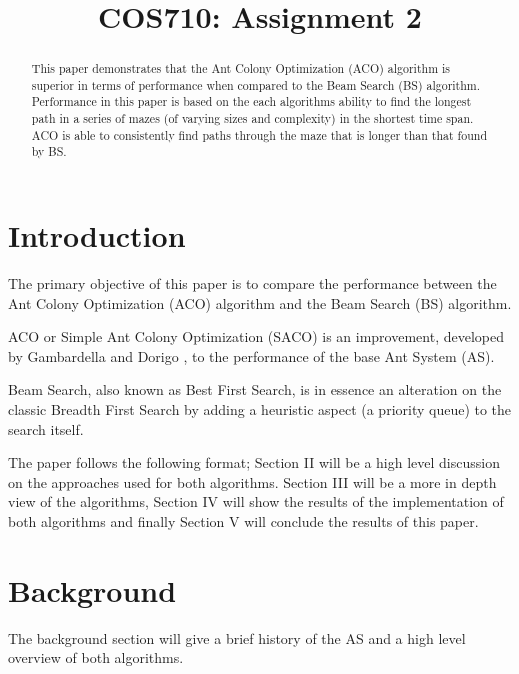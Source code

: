 \documentclass[conference]{IEEEtran}
\begin{document}
\title{COS710: Assignment 2}

\author{
}
\maketitle

\begin{abstract}
    This paper demonstrates that the Ant Colony Optimization (ACO) algorithm is superior in terms of performance when compared to the Beam Search (BS) algorithm. Performance in this paper is based on the each algorithms ability to find the longest path in a series of mazes (of varying sizes and complexity) in the shortest time span. ACO is able to consistently find paths through the maze that is longer than that found by BS.
\end{abstract}


\section{Introduction}
    The primary objective of this paper is to compare the performance between the Ant Colony Optimization (ACO) algorithm and the Beam Search (BS) algorithm.
    
    ACO or Simple Ant Colony Optimization (SACO) is an improvement, developed by Gambardella and Dorigo \cite{Slides1}, to the performance of the base Ant System (AS).
    
    Beam Search, also known as Best First Search, is in essence an alteration on the classic Breadth First Search by adding a heuristic aspect (a priority queue) to the search itself.
    
    The paper follows the following format; Section II will be a high level discussion on the approaches used for both algorithms. Section III will be a more in depth view of the algorithms, Section IV will show the results of the implementation of both algorithms and finally Section V will conclude the results of this paper.
\section{Background}
    The background section will give a brief history of the AS and a high level overview of both algorithms.
    
\end{document}
